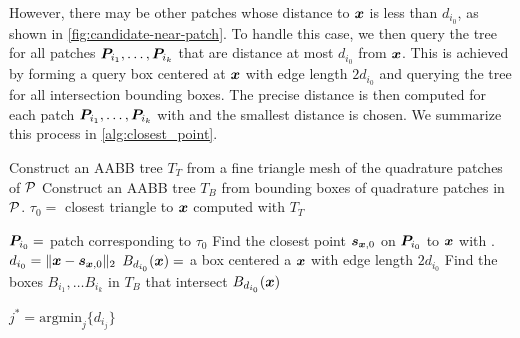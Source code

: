 However, there may be other patches whose distance to ${\bm{x}}$ is less than $d_{i_0}$, as shown in \cref{fig:candidate-near-patch}.
To handle this case, we then query the \aabb tree for all patches ${\bm{P}}_{i_1}, \hdots, {\bm{P}}_{i_k}$ that are distance at most $d_{i_0}$ from ${\bm{x}}$.
This is achieved by forming a query box centered at ${\bm{x}}$ with edge length $2d_{i_0}$ and querying the \aabb tree for all intersection bounding boxes. 
The precise distance is then computed for each patch  ${\bm{P}}_{i_1}, \hdots, {\bm{P}}_{i_k}$ with \cite[Section 2]{morse2020bsupplementary} and the smallest distance is chosen.
We summarize this process in \cref{alg:closest_point}.


\begin{algorithm}[!htp]

  \DontPrintSemicolon
  Construct an AABB tree $T_T$ from a fine triangle mesh of the quadrature patches of ${\mathcal{P}}$\;
  Construct an AABB tree $T_B$ from bounding boxes of quadrature patches in ${\mathcal{P}}$.\;
    $\tau_0 = $ closest triangle to ${\bm{x}}$ computed with $T_T$ \;
  
    ${\bm{P}}_{i_0} = $ patch corresponding to $\tau_0$\;
    Find the closest point $\bm{s}_{\bm{{\bm{x}}},0}$ on ${\bm{P}}_{i_0}$ to ${\bm{x}}$ with \cite[Section 2]{morse2020bsupplementary}.\;
    $d_{i_0} = \|{\bm{x}} - \bm{s}_{\bm{{\bm{x}}},0}\|_2$\;
    $B_{d_{i_0}}({\bm{x}})=$ a box centered a ${\bm{x}}$ with edge length $2d_{i_0}$\;
    Find the boxes $B_{i_1}, \hdots B_{i_k}$ in $T_B$ that intersect $B_{d_{i_0}}({\bm{x}})$\;
    
    $j^* = \mathrm{argmin}_j\{d_{i_j}\}$ \;
\end{algorithm}

